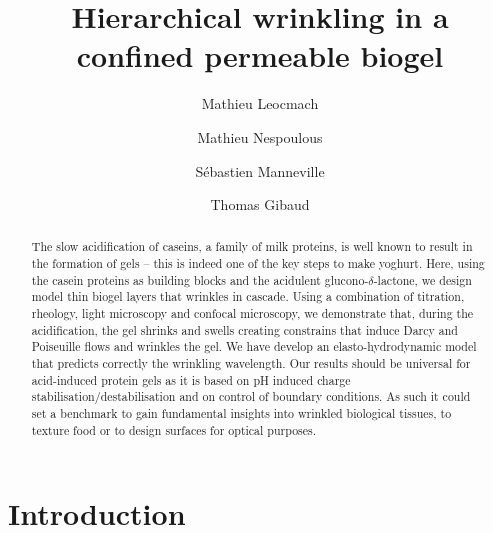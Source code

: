 \documentclass[twocolumn,superscriptaddress,showpacs,preprintnumbers,
amsmath,amssymb,prl]{revtex4-1}
\begin{document}
\title{Hierarchical wrinkling in a confined permeable biogel}
\author{Mathieu Leocmach}
\author{Mathieu Nespoulous}
\author{Sébastien Manneville}
\author{Thomas Gibaud}

\begin{abstract}
The slow acidification of caseins, a family of milk proteins, is well known to result in the formation of gels -- this is indeed one of the key steps to make yoghurt. Here, using the casein proteins as  building blocks and the acidulent glucono-$\delta$-lactone, we design model thin biogel layers that wrinkles in cascade. Using a combination of titration, rheology, light microscopy and confocal microscopy, we demonstrate that, during the acidification, the gel shrinks and swells creating constrains that induce Darcy and Poiseuille flows and wrinkles the gel. We have develop an elasto-hydrodynamic model that predicts correctly the wrinkling wavelength. Our results should be universal for acid-induced protein gels as it is based on pH induced charge stabilisation/destabilisation and on control of boundary conditions. As such it could set a benchmark to gain fundamental insights into wrinkled biological tissues, to texture food or to design surfaces for optical purposes.
\end{abstract}

\maketitle

\section*{Introduction}
\end{document}

